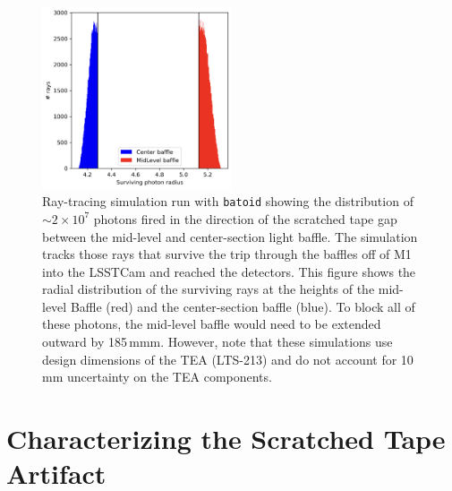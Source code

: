 \documentclass[SE,lsstdraft,authoryear,toc]{lsstdoc}
\begin{document}
\begin{figure}[th]
    \centering
    \includegraphics[width=0.5\textwidth]{figures/Baffle Gap Rays.png}
    \caption{Ray-tracing simulation run with \texttt{batoid} showing the distribution of $\sim 2\times 10^7$ photons fired in the direction of the scratched tape gap between the mid-level and center-section light baffle. The simulation tracks those rays that survive the trip through the baffles off of M1 into the LSSTCam and reached the detectors. This figure shows the radial distribution of the surviving rays at the heights of the mid-level Baffle (red) and the center-section baffle (blue). To block all of these photons, the mid-level baffle would need to be extended outward by 185\,mmm. However, note that these simulations use design dimensions of the TEA (LTS-213) and do not account for 10\,mm uncertainty on the TEA components.
}
\end{figure}

\section{Characterizing the Scratched Tape Artifact}
\label{sec:brightness}
\end{document}
